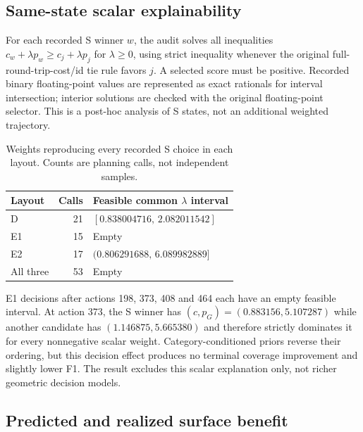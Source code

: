 \subsection{Same-state scalar explainability}

For each recorded S winner $w$, the audit solves all inequalities $c_w+\lambda p_w\ge c_j+\lambda p_j$ for $\lambda\ge0$, using strict inequality whenever the original full-round-trip-cost/id tie rule favors $j$. A selected score must be positive. Recorded binary floating-point values are represented as exact rationals for interval intersection; interior solutions are checked with the original floating-point selector. This is a post-hoc analysis of S states, not an additional weighted trajectory.

\begin{table}[!htbp]\centering\small\caption{Weights reproducing every recorded S choice in each layout. Counts are planning calls, not independent samples.}\label{tab:s-four-room-scalar}

\begin{tabular}{@{}lrl@{}}\toprule Layout & Calls & Feasible common $\lambda$ interval \\ \midrule

D & 21 & $[0.838004716,\,2.082011542]$ \\

E1 & 15 & Empty \\

E2 & 17 & $(0.806291688,\,6.089982889]$ \\

All three & 53 & Empty \\ \bottomrule\end{tabular}\end{table}

E1 decisions after actions 198, 373, 408 and 464 each have an empty feasible interval. At action 373, the S winner has $(c,p_G)=(0.883156,5.107287)$ while another candidate has $(1.146875,5.665380)$ and therefore strictly dominates it for every nonnegative scalar weight. Category-conditioned priors reverse their ordering, but this decision effect produces no terminal coverage improvement and slightly lower F1. The result excludes this scalar explanation only, not richer geometric decision models.

\subsection{Predicted and realized surface benefit}

